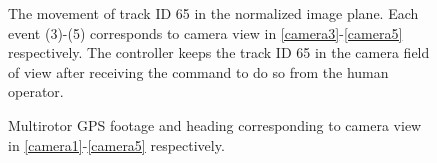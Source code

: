 \documentclass[letterpaper, 10 pt, conference]{ieeeconf}  %
\begin{document}
\begin{figure}[h]
	\centering
	\caption{The movement of track ID 65 in the normalized image plane. Each event (3)-(5) corresponds to camera view in \ref{camera3}-\ref{camera5} respectively. The controller keeps the track ID 65 in the camera field of view after receiving the command to do so from the human operator.}
	\label{image2}
\end{figure}


\begin{figure}[h]
	\centering
	\caption{Multirotor GPS footage and heading corresponding to camera view in \ref{camera1}-\ref{camera5} respectively.}
	\label{gps}
\end{figure}
\end{document}
